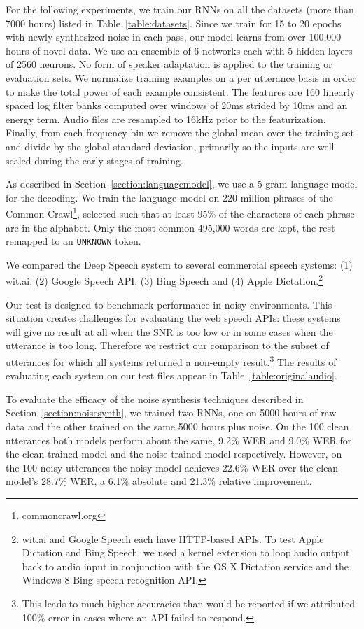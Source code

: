 \documentclass{article}
\begin{document}
For the following experiments, we train our RNNs on all the datasets (more than
7000 hours) listed in Table~\ref{table:datasets}.  Since we train for 15 to 20
epochs with newly synthesized noise in each pass, our model learns from over
100,000 hours of novel data.  We use an ensemble of 6 networks each with 5
hidden layers of 2560 neurons. No form of speaker adaptation is applied to the
training or evaluation sets.  We normalize training examples on a per utterance
basis in order to make the total power of each example consistent.  The
features are 160 linearly spaced log filter banks computed over windows of 20ms
strided by 10ms and an energy term.  Audio files are resampled to 16kHz prior
to the featurization. Finally, from each frequency bin we remove the global
mean over the training set and divide by the global standard deviation,
primarily so the inputs are well scaled during the early stages of training.

As described in Section~\ref{section:languagemodel}, we use a 5-gram language
model for the decoding.  We train the language model on 220 million phrases of
the Common Crawl\footnote{commoncrawl.org}, selected such that at least 95\% of
the characters of each phrase are in the alphabet. Only the most common 495,000
words are kept, the rest remapped to an \texttt{UNKNOWN} token.

We compared the Deep Speech system to several commercial speech systems: (1)
wit.ai, (2) Google Speech API, (3) Bing Speech and (4) Apple
Dictation.\footnote{wit.ai and Google Speech each have HTTP-based APIs. To test
Apple Dictation and Bing Speech, we used a kernel extension to loop audio
output back to audio input in conjunction with the OS X Dictation service and
the Windows 8 Bing speech recognition API.} 

Our test is designed to benchmark performance in noisy environments.  This
situation creates challenges for evaluating the web speech APIs:  these systems
will give no result at all when the SNR is too low or in some cases when the
utterance is too long.  Therefore we restrict our comparison to the subset of
utterances for which all systems returned a non-empty result.\footnote{This
leads to much higher accuracies than would be reported if we attributed 100\%
error in cases where an API failed to respond.} The results of evaluating each
system on our test files appear in Table~\ref{table:originalaudio}.  

To evaluate the efficacy of the noise synthesis techniques described in
Section~\ref{section:noisesynth}, we trained two RNNs, one on 5000 hours of raw
data and the other trained on the same 5000 hours plus noise.  On the 100 clean
utterances both models perform about the same, 9.2\% WER and 9.0\% WER for the
clean trained model and the noise trained model respectively.  However, on the
100 noisy utterances the noisy model achieves 22.6\% WER over the clean model's
28.7\% WER, a 6.1\% absolute and 21.3\% relative improvement.
\end{document}
